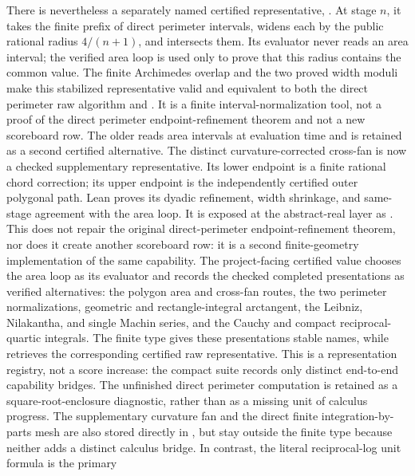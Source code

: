 \begin{theorem}
There is nevertheless a separately named certified representative,
. At stage \(n\), it takes the finite prefix
of direct perimeter intervals, widens each by the public rational radius
\(4/(n+1)\), and intersects them. Its evaluator never reads an area interval;
the verified area loop is used only to prove that this radius contains the
common value. The finite Archimedes overlap and the two proved width moduli
make this stabilized representative valid and equivalent to both the direct
perimeter raw algorithm and . It is a finite
interval-normalization tool, not a proof of the direct perimeter
endpoint-refinement theorem and not a new scoreboard row. The older
 reads area intervals at evaluation time and is
retained as a second certified alternative.
The distinct curvature-corrected cross-fan is now a checked supplementary
representative.  Its lower endpoint is a finite rational chord correction;
its upper endpoint is the independently certified outer polygonal path.
Lean proves its dyadic refinement, width shrinkage, and same-stage agreement
with the area loop.  It is exposed at the abstract-real layer as
.  This does not repair the original direct-perimeter
endpoint-refinement theorem, nor does it create another scoreboard row:
it is a second finite-geometry implementation of the same capability.
The project-facing certified value  chooses the
area loop as its evaluator and records the checked completed presentations
as verified alternatives: the polygon area and cross-fan routes, the two
perimeter normalizations, geometric and rectangle-integral arctangent, the
Leibniz, Nilakantha, and single Machin series, and the Cauchy and compact
reciprocal-quartic integrals.  The finite type 
gives these presentations stable names, while
 retrieves the corresponding certified
raw representative.  This is a representation registry, not a score increase:
the compact  suite records only distinct
end-to-end capability bridges.  The unfinished direct perimeter computation
is retained as a square-root-enclosure diagnostic, rather than as a missing
unit of calculus progress.  The supplementary curvature fan and the direct
finite integration-by-parts mesh are also stored directly in
, but stay outside the finite
 type because neither adds a distinct calculus bridge.
In contrast, the literal reciprocal-log unit formula is the primary

\end{theorem}
